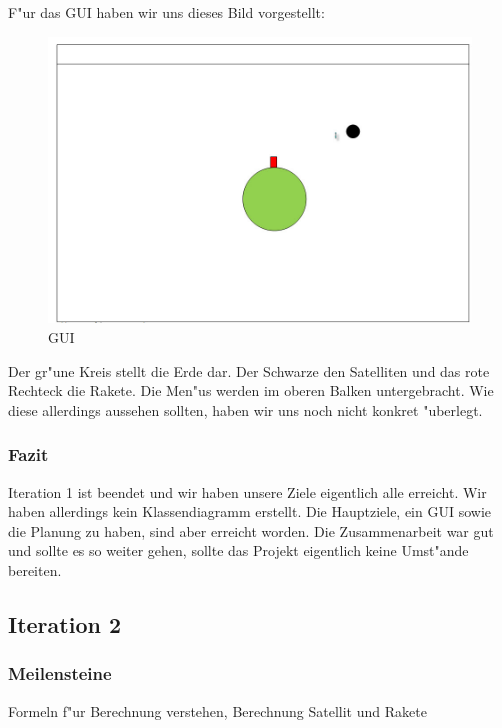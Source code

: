 \documentclass[11pt]{report}
\begin{document}
F"ur das GUI haben wir uns dieses Bild vorgestellt:
\begin{figure}[H]
\centering
\includegraphics[width=13cm]{GUI.jpg}
\caption{GUI}
\label{fig5}
\end{figure}
Der gr"une Kreis stellt die Erde dar. Der Schwarze den Satelliten und das rote Rechteck die Rakete. Die Men"us werden im oberen Balken untergebracht. Wie diese allerdings aussehen sollten, haben wir uns noch nicht konkret "uberlegt.
\subsubsection{Fazit}
Iteration 1 ist beendet und wir haben unsere Ziele eigentlich alle erreicht. Wir haben allerdings kein Klassendiagramm erstellt. Die Hauptziele, ein GUI sowie die Planung zu haben, sind aber erreicht worden. Die Zusammenarbeit war gut und sollte es so weiter gehen, sollte das Projekt eigentlich keine Umst"ande bereiten.
\subsection{Iteration 2}
\subsubsection{Meilensteine}
Formeln f"ur Berechnung verstehen, Berechnung Satellit und Rakete
\end{document}
